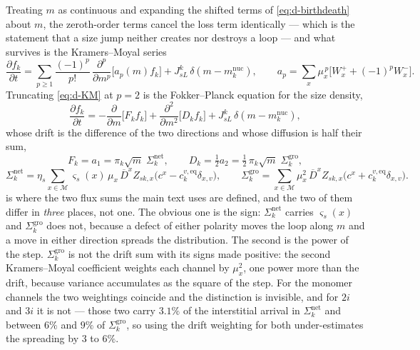 Treating $m$ as continuous and expanding the shifted terms of
\cref{eq:d-birthdeath} about $m$, the zeroth-order terms cancel the loss term
identically --- which is the statement that a size jump neither creates nor
destroys a loop --- and what survives is the Kramers--Moyal series
\begin{equation}
  \frac{\partial f_k}{\partial t}
  =\sum_{p\ge1}\frac{(-1)^{p}}{p!}\,
    \frac{\partial^{p}}{\partial m^{p}}\bigl[a_p(m)f_k\bigr]
   +J^k_{sL}\,\delta\!\left(m-m^{\mathrm{nuc}}_k\right),
  \qquad
  a_p=\sum_{x}\mu_x^{\,p}\bigl[W^{+}_{x}+(-1)^{p}W^{-}_{x}\bigr].
  \label{eq:d-KM}
\end{equation}
Truncating \cref{eq:d-KM} at $p=2$ is the Fokker--Planck equation for the size
density,
\begin{equation}
  \frac{\partial f_k}{\partial t}
  =-\frac{\partial}{\partial m}\bigl[F_kf_k\bigr]
   +\frac{\partial^{2}}{\partial m^{2}}\bigl[D_kf_k\bigr]
   +J^k_{sL}\,\delta\!\left(m-m^{\mathrm{nuc}}_k\right),
  \label{eq:d-FP}
\end{equation}
whose drift is the difference of the two directions and whose diffusion is half
their sum,
\begin{equation}
  F_k=a_1=\pi_k\sqrt m\;\Sigma^{\mathrm{net}}_k,
  \qquad
  D_k=\tfrac12a_2=\tfrac12\,\pi_k\sqrt m\;\Sigma^{\mathrm{gro}}_k,
  \label{eq:d-FPcoeffs}
\end{equation}
\begin{equation}
  \Sigma^{\mathrm{net}}_k
   =\eta_s\!\!\sum_{x\in\mathcal M}\!\!
      \varsigma_s(x)\,\mu_x\,\overline D^{x}Z_{sk,x}
      \bigl(c^{x}-c^{v,\mathrm{eq}}_k\delta_{x,v}\bigr),
  \qquad
  \Sigma^{\mathrm{gro}}_k
   =\sum_{x\in\mathcal M}\!\mu_x^{2}\,\overline D^{x}Z_{sk,x}
      \bigl(c^{x}+c^{v,\mathrm{eq}}_k\delta_{x,v}\bigr).
  \label{eq:d-Sigmas}
\end{equation}
 is where the two flux sums the main text uses are defined,
and the two of them differ in \emph{three} places, not one. The obvious one is
the sign: $\Sigma^{\mathrm{net}}_k$ carries $\varsigma_s(x)$ and
$\Sigma^{\mathrm{gro}}_k$ does not, because a defect of either polarity moves
the loop along $m$ and a move in either direction spreads the distribution. The
second is the power of the step. $\Sigma^{\mathrm{gro}}_k$ is not the drift sum
with its signs made positive: the second Kramers--Moyal coefficient weights each
channel by $\mu_x^{2}$, one power more than the drift, because variance
accumulates as the square of the step. For the monomer channels the two
weightings coincide and the distinction is invisible, and for $2i$ and $3i$ it is
not --- those two carry $3.1\%$ of the interstitial arrival in
$\Sigma^{\mathrm{net}}_k$ and between $6\%$ and $9\%$ of $\Sigma^{\mathrm{gro}}_k$,
so using the drift weighting for both under-estimates the spreading by $3$ to
$6\%$.

